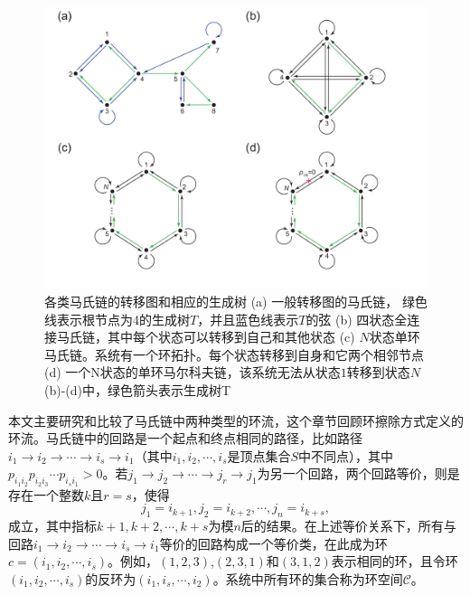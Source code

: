 \begin{figure}[h]\label{figure:transitiongraph}
\centering
\includegraphics[scale=0.5]{chart/transitiongraph.pdf}
\caption{各类马氏链的转移图和相应的生成树 (a) 一般转移图的马氏链， 绿色线表示根节点为4的生成树$T$，并且蓝色线表示$T$的弦 (b) 四状态全连接马氏链，其中每个状态可以转移到自己和其他状态 (c) 
$N$状态单环马氏链。系统有一个环拓扑。每个状态转移到自身和它两个相邻节点 (d) 一个N状态的单环马尔科夫链，该系统无法从状态$1$转移到状态$N$ (b)-(d)中，绿色箭头表示生成树T}
\end{figure}

本文主要研究和比较了马氏链中两种类型的环流，这个章节回顾环擦除方式定义的环流\cite{jiang2004mathematical,kalpazidou2007cycle}。马氏链中的回路是一个起点和终点相同的路径，比如路径$i_1 \to i_2 \to\cdots\to i_s \to i_1$（其中$i_1, i_2 , \cdots, i_s$是顶点集合$S$中不同点），其中$p_{i_1i_2}p_{i_2i_3}\cdots p_{i_si_1}>0$。若$j_1 \to j_2 \to\cdots\to j_r \to j_1$为另一个回路，两个回路等价，则是存在一个整数$k$且$r=s$，使得
\begin{equation*}
    j_1 = i_{k+1},j_2 = i_{k+2},\cdots,j_n = i_{k+s},
\end{equation*}
成立，其中指标$k+1,k+2,\cdots,k+s$为模$n$后的结果。在上述等价关系下，所有与回路$i_1 \to i_2 \to\cdots\to i_s \to i_1$等价的回路构成一个等价类，在此成为环$c = (i_1,i_2,\cdots,i_s)$。例如，$(1,2,3)$,$(2,3,1)$和$(3,1,2)$表示相同的环，且令环$(i_1,i_2,\cdots,i_s)$的反环为$(i_1,i_s,\cdots,i_2)$。系统中所有环的集合称为环空间$\mathcal{C}$。

